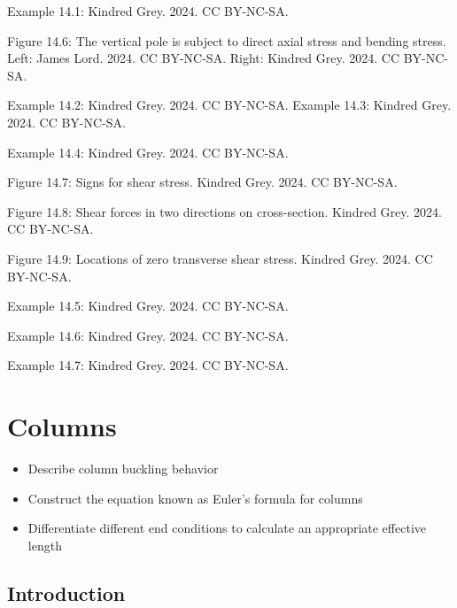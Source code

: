 \documentclass[
  letterpaper,
  DIV=11,
  numbers=noendperiod]{scrreprt}
\providecommand{\tightlist}{%
  \setlength{\itemsep}{0pt}\setlength{\parskip}{0pt}}\usepackage{longtable,booktabs,array}
\theoremstyle{definition}
\theoremstyle{remark}
\begin{document}
Example 14.1: Kindred Grey. 2024. CC BY-NC-SA.

Figure 14.6: The vertical pole is subject to direct axial stress and
bending stress. Left: James Lord. 2024. CC BY-NC-SA. Right: Kindred
Grey. 2024. CC BY-NC-SA.

Example 14.2: Kindred Grey. 2024. CC BY-NC-SA. Example 14.3: Kindred
Grey. 2024. CC BY-NC-SA.

Example 14.4: Kindred Grey. 2024. CC BY-NC-SA.

Figure 14.7: Signs for shear stress. Kindred Grey. 2024. CC BY-NC-SA.

Figure 14.8: Shear forces in two directions on cross-section. Kindred
Grey. 2024. CC BY-NC-SA.

Figure 14.9: Locations of zero transverse shear stress. Kindred Grey.
2024. CC BY-NC-SA.

Example 14.5: Kindred Grey. 2024. CC BY-NC-SA.

Example 14.6: Kindred Grey. 2024. CC BY-NC-SA.

Example 14.7: Kindred Grey. 2024. CC BY-NC-SA.


\chapter{Columns}\label{sec-columns}

\begin{tcolorbox}[enhanced jigsaw, leftrule=.75mm, bottomrule=.15mm, opacityback=0, opacitybacktitle=0.6, colframe=quarto-callout-note-color-frame, toprule=.15mm, colbacktitle=quarto-callout-note-color!10!white, coltitle=black, bottomtitle=1mm, title={Learning Objectives}, titlerule=0mm, toptitle=1mm, colback=white, rightrule=.15mm, left=2mm, arc=.35mm, breakable]

\begin{itemize}
\tightlist
\item
  Describe column buckling behavior
\item
  Construct the equation known as Euler's formula for columns
\item
  Differentiate different end conditions to calculate an appropriate
  effective length
\end{itemize}

\end{tcolorbox}

\section*{Introduction}\label{introduction-14}
\end{document}
